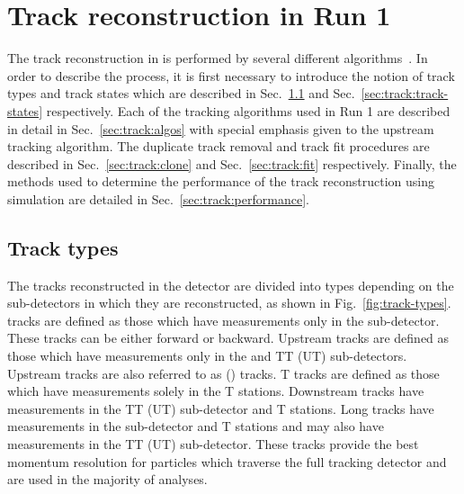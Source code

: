 \section{Track reconstruction in Run 1}
\label{sec:track}

The track reconstruction in \lhcb is performed by several different algorithms~\cite{tracking}. In order to describe the process, it is first necessary to introduce the notion of track types and track states which are described in Sec.~\ref{sec:track:track-types} and Sec.~\ref{sec:track:track-states} respectively. Each of the tracking algorithms used in Run 1 are described in detail in Sec.~\ref{sec:track:algos} with special emphasis given to the upstream tracking algorithm. The duplicate track removal and track fit procedures are described in Sec.~\ref{sec:track:clone} and Sec.~\ref{sec:track:fit} respectively. Finally, the methods used to determine the performance of the track reconstruction using simulation are detailed in Sec.~\ref{sec:track:performance}.

\subsection{Track types}
\label{sec:track:track-types}

The tracks reconstructed in the \lhcb detector are divided into types depending on the sub-detectors in which they are reconstructed, as shown in Fig.~\ref{fig:track-types}. \velo tracks are defined as those which have measurements only in the \velo sub-detector. These tracks can be either forward or backward. Upstream tracks are defined as those which have measurements only in the \velo and TT (UT) sub-detectors. Upstream tracks are also referred to as \velott(\velout) tracks. T tracks are defined as those which have measurements solely in the T stations. Downstream tracks have measurements in the TT (UT) sub-detector and T stations. Long tracks have measurements in the \velo sub-detector and T stations and may also have measurements in the TT (UT) sub-detector. These tracks provide the best momentum resolution for particles which traverse the full tracking detector and are used in the majority of \lhcb analyses.

